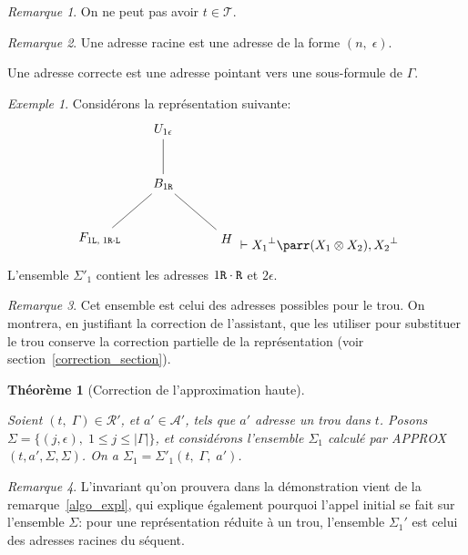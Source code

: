 \documentclass[11pt,a4paper]{article}
\theoremstyle{plain}
\newtheorem{theorem}{Théorème}
\theoremstyle{definition}
\theoremstyle{remark}
\newtheorem{remark}{Remarque}
\newtheorem{example}{Exemple}
\newcommand*{\orth}{^\perp}
\newcommand*{\tensor}{\otimes}
\newcommand*{\sequent}{\Gamma}
\newcommand*{\Left}{\textnormal{\texttt{L}}}
\newcommand*{\Right}{\textnormal{\texttt{R}}}
\newcommand*{\treeaddresses}{\ensuremath{\mathcal{A'}}}
\newcommand*{\trees}{\ensuremath{\mathcal{T}}}
\newcommand*{\representationspartial}{\ensuremath{\mathcal{R'}}}
\newcommand*{\highapprox}{\ensuremath{\Sigma_1}}
\newcommand*{\highapproxspec}{\ensuremath{\Sigma'_1}}
\begin{document}
\begin{remark}
     On ne peut pas avoir $t \in \trees$.
\end{remark}

\begin{remark}
    Une adresse racine est une adresse de la forme $(n, \; \epsilon)$.
    
    Une adresse correcte est une adresse pointant vers une sous-formule de $\sequent$.
\end{remark}

\begin{example}Considérons la représentation suivante:
    \begin{equation*}
        \begin{tikzpicture}%
            [level 2/.style={sibling distance=3.5cm}]
            \node {$U_{1 \epsilon}$}
            child {node {$B_{1 \Right}$}
                child {node {$F_{1 \Left, \; 1 \Right \cdot \Left}$}}
                child {node {$H$}}
            };
        \end{tikzpicture}
        \vdash {X_1}\orth \parr (X_1 \tensor X_2), {X_2}\orth
    \end{equation*}

    L'ensemble $\highapproxspec$ contient les adresses $1 \Right \cdot \Right$ et $2 \epsilon$.
\end{example}

\begin{remark}
     Cet ensemble est celui des adresses possibles pour le trou. On montrera, en justifiant la correction de l'assistant, que les utiliser pour substituer le trou conserve la correction partielle de la représentation (voir section~\ref{correction_section}).
\end{remark}

\begin{theorem}[Correction de l'approximation haute]
    \label{highapprox_correction}
    
    Soient $(t, \; \sequent) \in \representationspartial$, et $a' \in \treeaddresses$, tels que $a'$ adresse un trou dans $t$. Posons $\Sigma = \{ (j, \epsilon), \; 1 \leq j \leq |\sequent| \}$, et considérons l'ensemble $\highapprox$ calculé par APPROX$(t, a', \Sigma, \Sigma)$.
    On a $\highapprox = \highapproxspec \left( t, \; \sequent, \; a' \right)$.
\end{theorem}

\begin{remark}
    L'invariant qu'on prouvera dans la démonstration vient de la remarque~\ref{algo_expl}, qui explique également pourquoi l'appel initial se fait sur l'ensemble $\Sigma$: pour une représentation réduite à un trou, l'ensemble $\highapprox'$ est celui des adresses racines du séquent.
\end{remark}
\end{document}
